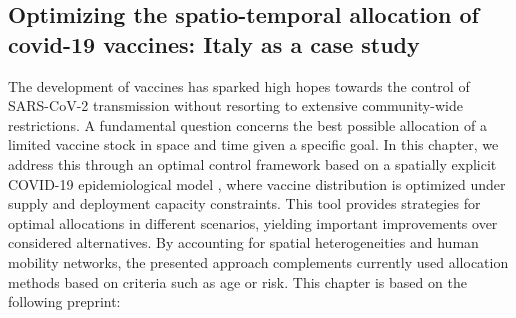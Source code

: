 \begin{fullwidth}
	\chapter[Optimizing the spatio-temporal allocation of  covid-19 vaccines: Italy as a case study]{Optimizing the spatio-temporal allocation of \\covid-19 vaccines: Italy as a case study}
\label{ch:covid-italy-ocp}

The development of vaccines has sparked high hopes towards the control of SARS-CoV-2 transmission without resorting to extensive community-wide restrictions. A fundamental question concerns the best possible allocation of a limited vaccine stock in space and time given a specific goal. In this chapter, we address this through an optimal control framework based on a spatially explicit COVID-19 epidemiological model \parencite{Bertuzzo:GeographyCOVID19Spread:2020,Gatto:SpreadDynamicsCOVID19:2020}, where vaccine distribution is optimized under supply and deployment capacity constraints. This tool provides strategies for optimal allocations in different scenarios, yielding important improvements over considered alternatives. By accounting for spatial heterogeneities and human mobility networks, the presented approach complements currently used allocation methods based on criteria such as age or risk.
This chapter is based on the following preprint: 


\end{fullwidth}
